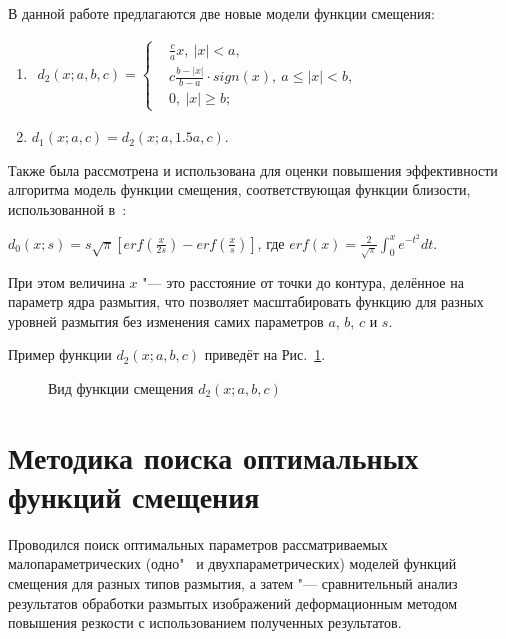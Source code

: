 В данной работе предлагаются две новые модели функции смещения:

\begin{enumerate}[beginpenalty=10000]	
	\item
	$
	\begin{aligned}
		d_2\left(x; a, b, c\right)=\left\{
		\begin{aligned}
			&\frac{c}{a}x,\ \left|x\right|<a,\\
			&c\frac{b-\left|x\right|}{b-a} \cdot sign\left(x\right),\ a\le\left|x\right|<b,\\
			&0,\ \left|x\right|\geq b;
		\end{aligned}
		\right.
	\end{aligned}
	$
	
	\item $d_1\left(x; a, c\right) = d_2\left(x; a, 1.5a, c\right)$.
\end{enumerate}

Также была рассмотрена и использована для оценки повышения эффективности алгоритма модель функции смещения, соответствующая функции близости, использованной в~\cite{nasonova2014deblurred, gusev2016parallel}:

$d_0\left(x; s\right)=s\sqrt\pi\left[erf\left(\frac{x}{2s}\right)-erf\left(\frac{x}{s}\right)\right]$, где $erf{\left(x\right)}=\frac{2}{\sqrt\pi}\int_{0}^{x}{e^{-t^2}dt}$.

При этом величина $x$ "--- это расстояние от точки до контура, делённое на параметр ядра размытия, что позволяет масштабировать функцию для разных уровней размытия без изменения самих параметров $a$, $b$, $c$ и $s$.

Пример функции $d_2(x; a, b, c)$ приведёт на Рис.~\ref{fig:warping-d2-example}.

\begin{figure}[ht]
	\caption{Вид функции смещения $d_2(x;a,b,c)$}
	\label{fig:warping-d2-example}
\end{figure}

\section{Методика поиска оптимальных функций смещения}

Проводился поиск оптимальных параметров рассматриваемых малопараметрических (одно"~ и двухпараметрических) моделей функций смещения для разных типов размытия, а затем "--- сравнительный анализ результатов обработки размытых изображений деформационным методом повышения резкости с использованием полученных результатов.

